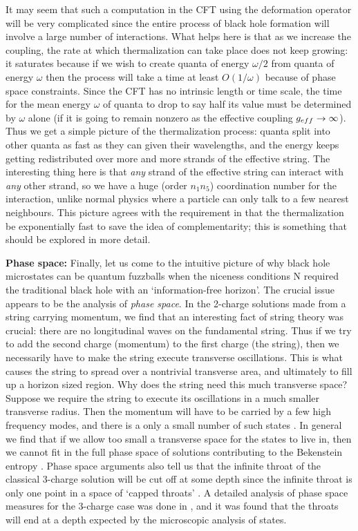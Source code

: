 \documentclass[12pt]{article}
\begin{document}
It may seem that such a computation in the CFT using  the deformation operator will be very complicated since the entire process of black hole formation will involve a large number of interactions. What helps here is that as we increase the coupling, the rate at which thermalization can take place does not keep growing: it saturates because if we wish to create quanta of energy $\omega/2$ from quanta of energy $\omega$ then the process will take a time at least $O(1/\omega)$ because of phase space constraints. Since the CFT has no intrinsic length or time scale,  the time for the mean energy $\omega$ of quanta to drop to say half its value must be determined by $\omega$ alone (if it is going to remain nonzero as the effective coupling $g_{eff}\rightarrow\infty$). Thus we get a simple picture of the thermalization process: quanta split into other quanta as fast as they can given their wavelengths, and the energy keeps getting redistributed over more and more strands of the effective string. The interesting thing here is that {\it any} strand of the effective string can interact with {\it any} other strand, so we have a huge (order $n_1n_5$) coordination number for the interaction, unlike normal physics where a particle can only talk to a few nearest neighbours. This picture agrees with the requirement in \cite{hayden} that the thermalization be exponentially fast to save the idea of complementarity; this is something that should be explored in more detail.


\b




{\bf Phase space:} \quad Finally, let us come to the intuitive picture of why black hole microstates can be quantum fuzzballs when the niceness conditions N required the traditional black hole with an `information-free horizon'. The crucial issue appears to be the analysis of {\it phase space}. In the 2-charge solutions made from a string carrying momentum, we find that an interesting fact of string theory was crucial: there are no longitudinal waves on the fundamental string. Thus if we try to add the second charge (momentum) to the first charge (the string), then we necessarily have to make the string execute transverse oscillations. This is what causes the string to spread over a nontrivial transverse area, and ultimately to fill up a horizon sized region. Why does the string need this much transverse space? Suppose we require the string to execute its oscillations in a much smaller transverse radius. Then the momentum will have to be carried by a few high frequency modes, and there is a only a small number of such states \cite{review}. In general we find that if we allow too small a transverse space for the states to live in, then we cannot fit in the full phase space of solutions contributing to the Bekenstein entropy \cite{phase}.
Phase space arguments also tell us that the infinite throat of the classical 3-charge solution will be cut off at some depth since the infinite throat is only one point in a space of `capped throats' \cite{phase}. A detailed analysis of phase space measures for the 3-charge case was done in \cite{deboer2}, and it was found that the throats will end at a depth expected by the microscopic analysis of states.
\end{document}
